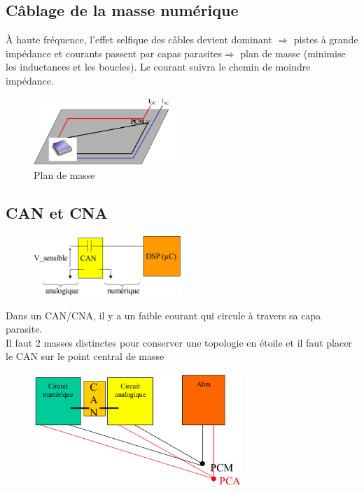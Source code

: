 \subsection{Câblage de la masse numérique}
À haute fréquence, l'effet selfique des câbles devient dominant \(\Rightarrow\) pistes à grande impédance et courants passent par capas parasites\(\Rightarrow\)  plan de masse (minimise les inductances et les boucles). Le courant suivra le chemin de moindre impédance.
\begin{figure}[H] 
	\centering 
	\includegraphics[width=0.5\textwidth,height=10\baselineskip,keepaspectratio]{ch3/image30} 
	\caption{Plan de masse} 
\end{figure}
\subsection{CAN et CNA}
\begin{figure}[H] 
	\centering 
	\includegraphics[width=0.5\textwidth]{ch3/image31} 
\end{figure}
Dans un CAN/CNA, il y a un faible courant qui circule à travers sa capa parasite.\\
Il faut 2 masses distinctes pour conserver une topologie en étoile et il faut placer le CAN sur le point central de masse
\begin{figure}[H] 
	\centering 
	\includegraphics[width=0.7\textwidth,height=10\baselineskip,keepaspectratio]{ch3/image32} 
\end{figure}

